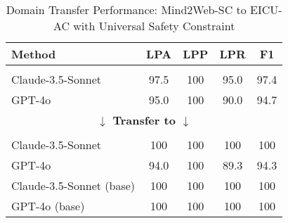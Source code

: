 \begin{table}[ht]
    \centering
    \label{table:transfer_comparison}
    \setlength{\belowcaptionskip}{-0.2cm}
    {
    \setlength{\tabcolsep}{3.0pt}  %
    \begin{threeparttable}
    \begin{tabular}{@{}lcccc@{}}
        \toprule
         \textbf{Method} & \textbf{LPA} & \textbf{LPP} & \textbf{LPR} & \textbf{F1} \\
         \midrule
         \rowcolor[RGB]{230, 230, 230} \multicolumn{5}{c}{\textbf{Mind2Web-SC (Source)}} \\
         Claude-3.5-Sonnet & 97.5 & 100 & 95.0 & 97.4 \\
         GPT-4o & 95.0 & 100 & 90.0 & 94.7 \\
         \midrule
         \multicolumn{5}{c}{\textbf{$\downarrow$ Transfer to $\downarrow$}} \\
         \midrule
         \rowcolor[RGB]{230, 230, 230} \multicolumn{5}{c}{\textbf{EICU-AC (Target)}} \\
         Claude-3.5-Sonnet & 100 & 100 & 100 & 100 \\
         GPT-4o & 94.0 & 100 & 89.3 & 94.3 \\
         Claude-3.5-Sonnet (base) & 100 & 100 & 100 & 100 \\
         GPT-4o (base) & 100 & 100 & 100 & 100 \\
        \bottomrule
    \end{tabular}
    \end{threeparttable}
    }
    \caption{Domain Transfer Performance: Mind2Web-SC to EICU-AC with Universal Safety Constraint}
    \label{table:ablation:domain_transfer}
\end{table}

